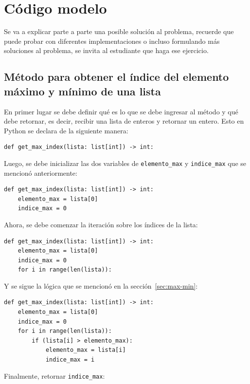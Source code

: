 \documentclass{article}
\begin{document}
\section{Código modelo}

Se va a explicar parte a parte una posible solución al problema, recuerde que puede probar con diferentes implementaciones o incluso formulando más soluciones al problema, se invita al estudiante que haga ese ejercicio.

\subsection{Método para obtener el índice del elemento máximo y mínimo de una lista}

En primer lugar se debe definir qué es lo que se debe ingresar al método y qué debe retornar, es decir, recibir una lista de enteros y retornar un entero. Esto en Python se declara de la siguiente manera:

\begin{lstlisting}[style=pythonstyle]
def get_max_index(lista: list[int]) -> int:
\end{lstlisting}

Luego, se debe inicializar las dos variables de \texttt{elemento\_max} y \texttt{indice\_max} que se mencionó anteriormente:

\begin{lstlisting}[style=pythonstyle]
def get_max_index(lista: list[int]) -> int:
    elemento_max = lista[0]
    indice_max = 0
\end{lstlisting}

Ahora, se debe comenzar la iteración sobre los índices de la lista:

\begin{lstlisting}[style=pythonstyle]
def get_max_index(lista: list[int]) -> int:
    elemento_max = lista[0]
    indice_max = 0
    for i in range(len(lista)):
\end{lstlisting}

Y se sigue la lógica que se mencionó en la sección~\ref{sec:max-min}:

\begin{lstlisting}[style=pythonstyle]
def get_max_index(lista: list[int]) -> int:
    elemento_max = lista[0]
    indice_max = 0
    for i in range(len(lista)):
        if (lista[i] > elemento_max):
            elemento_max = lista[i]
            indice_max = i
\end{lstlisting}

Finalmente, retornar \texttt{indice\_max}:
\end{document}
